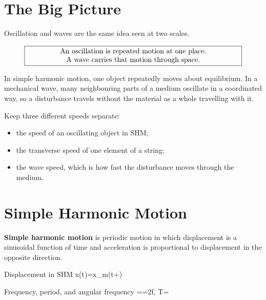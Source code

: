 \documentclass{studentnotes}
\begin{document}
\makenotetitle

\tableofcontents
\newpage

\section{The Big Picture}

Oscillation and waves are the same idea seen at two scales.

\[
    \boxed{
    \begin{minipage}{0.86\linewidth}
        \centering
        An oscillation is repeated motion at one place.\\
        A wave carries that motion through space.
    \end{minipage}}
\]

In simple harmonic motion, one object repeatedly moves about equilibrium. In a
mechanical wave, many neighbouring parts of a medium oscillate in a coordinated
way, so a disturbance travels without the material as a whole travelling with it.

\begin{importantnote}
    Keep three different speeds separate:
    \begin{itemize}
        \item the speed of an oscillating object in SHM;
        \item the transverse speed of one element of a string;
        \item the wave speed, which is how fast the disturbance moves through the medium.
    \end{itemize}
\end{importantnote}

\section{Simple Harmonic Motion}

\begin{definition}
    \textbf{Simple harmonic motion} is periodic motion in which displacement is a
    sinusoidal function of time and acceleration is proportional to displacement
    in the opposite direction.
\end{definition}

\begin{namedformula}{Displacement in SHM}
    x(t)=x_m\cos(\omega t+\phi)
\end{namedformula}

\begin{namedformula}{Frequency, period, and angular frequency}
    \omega==2\pi f,
    \qquad
    T=
\end{namedformula}
\end{document}
